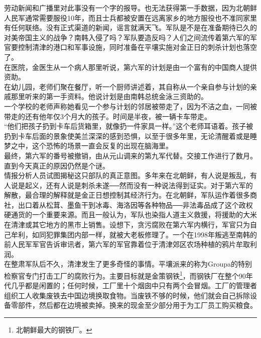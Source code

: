 \begin{multicols}{\theparacolNo}
劳动新闻和广播里对此事没有一个字的报导。也无法获得第一手数据，因为北朝鲜人民军通常需要服役10年，而且士兵都被安置在远离家乡的地方服役也不准同家里有任何联络。没有正式渠道的新闻，谣言就满天飞。军队是不是在准备期待已久的对美帝国主义的战争？南韩入侵了吗？军队要造反吗？人们之间流传着第六军的军官要控制清津的港口和军事设施，同时准备在平壤实施对金正日的刺杀计划也落空了。\\

在医院，金医生从一个病人那里听说，第六军的计划是由一个富有的中国商人提供资助。\\

在幼儿园，老师们聚在餐厅，听一个厨师讲述着，其自称从一个亲自参与计划的亲戚那里听来的第一手资料。他说计划是由南韩总统金泳三资助的。\\

一个学校的老师声称她看见一个参与计划的邻居被带走了，因为不洁之血，一同被带走的还有他年仅3个月大的孩子。时间是半夜，被一辆卡车带走。\\

“他们把孩子扔到卡车后货箱里，就像扔一件家具一样。”这个老师耳语着。孩子被扔到卡车后面的景象使美兰深深的感到恐惧，以至于很多年里，无论清醒着或是睡梦之中，这个恐怖的场景一直会反复的出现在脑海里。\\

最终，第六军的番号被撤销，由从元山调来的第九军代替。交接工作进行了数月。直到今天真正的原因仍然是个谜。\\

情报分析人员试图揭秘这只部队的真正意图。多年来在北朝鲜，有人说是叛乱，有人说是起义，还有人说是刺杀未遂──然而没有一种说法得到证实。对于第六军的解散，最合理的解释就是金正日想控制其经济行为。在北朝鲜，军队运作着很多商社，出口着从松茸、墨鱼干到冰毒、海洛因等各种物品──非法毒品成了这个政权硬通货的一个重要来源。而且一般认为，军队也染指人道主义救援，将援助的大米在清津或其它地方的黑市上销售。设想下，贪污腐败在第六军内横行，军官只为自己牟利，如同犯罪集团内部一样，就被大老板修理了。一个在1998年叛逃至南韩的前人民军军官告诉审讯者，第六军的军官靠着位于清津郊区农场种植的鸦片牟取利润。\\

在整肃军队后不久，清津发生了更多奇怪的事情。平壤派来的称为Groupa的特别检察官专门打击工厂的腐败行为。主要目标就是金策钢铁\footnote{北朝鲜最大的钢铁厂。}，而钢铁厂在整个90年代几乎都是闲置的；任何时候，工厂里十个烟囱中只有两个会冒烟。工厂的管理者组织工人收集废铁去中国边境换取食物。当废铁不够的时候，他们就会自己拆除设备零部件，然后都在边境被卖掉。换来的现金至少部分用于为工厂员工购买粮食。\\


\end{multicols}
